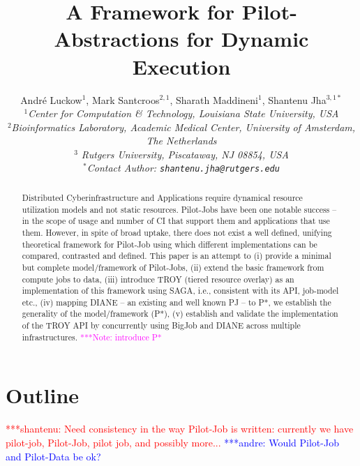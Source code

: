 \documentclass[conference,final]{IEEEtran}
\title{A Framework for Pilot-Abstractions for Dynamic Execution}
\date{}
\newcommand{\jhanote}[1]{ {\textcolor{red} { ***shantenu: #1 }}}
\newcommand{\alnote}[1]{ {\textcolor{blue} { ***andre: #1 }}}
\newcommand{\note}[1]{ {\textcolor{magenta} { ***Note: #1 }}}
\newcommand{\alnote}[1]{}
\newcommand{\jhanote}[1]{}
\newcommand{\note}[1]{}
\newcommand{\up}{\vspace*{-1em}}
\begin{document}
\ifpdf
{}
\else
{}
\fi

\author{
  Andr\'e Luckow$^{1}$, Mark Santcroos$^{2,1}$, Sharath Maddineni$^{1}$, Shantenu Jha$^{3,1*}$\\
  \small{\emph{$^{1}$Center for Computation \& Technology, Louisiana State University, USA}}\\
 \small{\emph{$^{2}$Bioinformatics Laboratory, Academic Medical Center, University of Amsterdam, The Netherlands}}\\
 \small{\emph{$^{3}$ Rutgers University, Piscataway, NJ 08854, USA}}\\
  \small{\emph{$^{*}$Contact Author: \texttt{shantenu.jha@rutgers.edu}}}\\
  \up\up\up\up }

\maketitle

\begin{abstract}
  Distributed Cyberinfrastructure and Applications require dynamical
  resource utilization models and not static resources.  Pilot-Jobs
  have been one notable success -- in the scope of usage and number of
  CI that support them and applications that use them.  However, in
  spite of broad uptake, there does not exist a well defined, unifying
  theoretical framework for Pilot-Job using which different
  implementations can be compared, contrasted and defined. This paper
  is an attempt to (i) provide a minimal but complete model/framework
  of Pilot-Jobs, (ii) extend the basic framework from compute jobs to
  data, (iii) introduce TROY (tiered resource overlay) as an
  implementation of this framework using SAGA, i.e., consistent with
  its API, job-model etc., (iv) mapping DIANE -- an existing and well
  known PJ -- to P*, we establish the generality of the
  model/framework (P*), (v) establish and validate the implementation
  of the TROY API by concurrently using BigJob and DIANE across
  multiple infrastructures.
\note{introduce P*}
\end{abstract}

\section*{Outline}

\jhanote{Need consistency in the way Pilot-Job is written: currently
  we have pilot-job, Pilot-Job, pilot job, and possibly more...}
\alnote{Would Pilot-Job and Pilot-Data be ok?}
\end{document}
